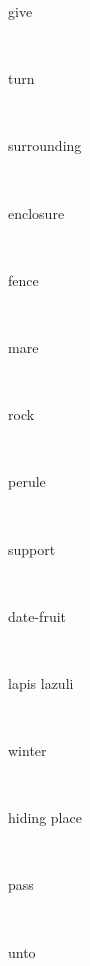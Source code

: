 \documentclass[a4paper]{article}
\begin{document}
\begin{multicols}{4}
\begin{multicols}{4}
\begin{multicols}{5}
{\hebrewfont{}} \begin{english}give\end{english}\\
{\hebrewfont{}} \begin{english}turn\end{english}\\
{\hebrewfont{}} \begin{english}surrounding\end{english}\\
{\hebrewfont{}} \begin{english}enclosure\end{english}\\
{\hebrewfont{}} \begin{english}fence\end{english}\\
{\hebrewfont{}} \begin{english}mare\end{english}\\
{\hebrewfont{}} \begin{english}rock\end{english}\\
{\hebrewfont{}} \begin{english}perule\end{english}\\
{\hebrewfont{}} \begin{english}support\end{english}\\
{\hebrewfont{}} \begin{english}date-fruit\end{english}\\
{\hebrewfont{}} \begin{english}lapis lazuli\end{english}\\
{\hebrewfont{}} \begin{english}winter\end{english}\\
{\hebrewfont{}} \begin{english}hiding place\end{english}\\
{\hebrewfont{}} \begin{english}pass\end{english}\\
{\hebrewfont{}} \begin{english}unto\end{english}\\

\end{multicols}
\end{multicols}
\end{multicols}
\end{document}
